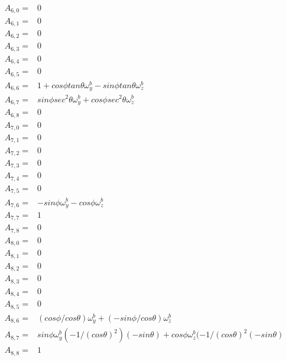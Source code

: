 \documentclass[conference]{IEEEtran}
\begin{document}
\begin{align*}
A_{6,0} =& 0\\
A_{6,1} =& 0\\
A_{6,2} =& 0\\
A_{6,3} =& 0 \\
A_{6,4} =& 0 \\
A_{6,5} =& 0 \\
A_{6,6} =& 1 + cos \phi tan \theta \omega_y^b - sin \phi tan \theta \omega_z^b \\
A_{6,7} =& sin\phi sec^2 \theta \omega_y^b +cos \phi sec^2 \theta \omega_z^b\\
A_{6,8} =& 0 \\
A_{7,0} =& 0\\
A_{7,1} =& 0\\
A_{7,2} =& 0\\
A_{7,3} =& 0 \\
A_{7,4} =& 0 \\
A_{7,5} =& 0 \\
A_{7,6} =& -sin\phi \omega_y^b - cos \phi \omega_z^b \\
A_{7,7} =& 1\\
A_{7,8} =& 0\\
A_{8,0} =& 0\\
A_{8,1} =& 0\\
A_{8,2} =& 0\\
A_{8,3} =& 0 \\
A_{8,4} =& 0 \\
A_{8,5} =& 0 \\
A_{8,6} =& (cos \phi / cos \theta) \omega_y^b + (-sin\phi / cos\theta) \omega_z^b \\
A_{8,7} =& sin \phi \omega_y^b (-1 / ( cos \theta )^2) (-sin \theta) + cos \phi \omega_z^b (-1/(cos \theta)^2 (-sin \theta) \\
A_{8,8} =& 1\\
\end{align*}
\end{document}
